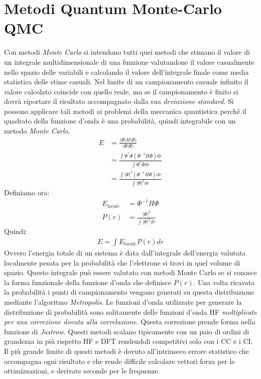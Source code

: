 \documentclass[oneside]{amsbook}
\numberwithin{section}{chapter}
\numberwithin{equation}{section}
\numberwithin{figure}{section}
\begin{document}
\section{Metodi Quantum Monte-Carlo QMC}
Con metodi \emph{Monte Carlo} si intendono tutti quei metodi che stimano il valore di un integrale multidimensionale di una funzione valutandone il valore casualmente nello spazio delle variabili e calcolando il valore dell'integrale finale come media statistica delle stime casuali. Nel limite di un campionamento casuale infinito il valore calcolato coincide con quello reale, ma se il campionamento è finito si dovrà riportare il risultato accompagnato dalla sua \emph{deviazione standard}.
Si possono applicare tali metodi ai problemi della meccanica quantistica perché il quadrato della funzione d'onda è una probabilità, quindi integrabile con un metodo \emph{Monte Carlo}.
\begin{equation}
\begin{aligned}
E&=\frac{\langle\Phi\vert H\vert \Phi \rangle}{\langle\Phi\vert\Phi\rangle} \\
&= \frac{\int \Phi^* \Phi (\Phi^{-1}H\Phi) dr}{\int \Phi^*\Phi dr} \\
&= \frac{\int\vert \Phi\vert^2 (\Phi^{-1}H\Phi) dr}{\int \vert \Phi\vert^2 dr} 
\end{aligned}
\end{equation}
Definiamo ora:
\begin{equation}
\begin{aligned}
E_{locale} &= \Phi^{-1}H\Phi \\
P(r) &=\frac{\vert \Phi\vert^2 }{\int \vert \Phi\vert^2 dr} 
\end{aligned}
\end{equation}
Quindi:
\begin{equation}
\begin{aligned}
E= \int E_{locale} P(r) dr
\end{aligned}
\end{equation}
Ovvero l'energia totale di un sistema è data dall'integrale dell'energia valutata localmente pesata per la probabilità che l'elettrone si trovi in quel volume di spazio.
Questo integrale può essere valutato con metodi Monte Carlo se si conosce la forma funzionale della funzione d'onda che definisce $P(r)$. Una volta ricavata la probabilità i punti di campionamento vengono generati su questa distribuzione mediante l'algoritmo \emph{Metropolis}. Le funzioni d'onda utilizzate per generare la distribuzione di probabilità sono solitamente delle funzioni d'onda HF \emph{moltiplicate per una correzione dovuta alla correlazione}. Questa correzione prende forma nella funzione di \emph{Jastrow}.
Questi metodi scalano tipicamente con un paio di ordini di grandezza in più rispetto HF e DFT rendendoli competitivi solo con i CC e i CI. Il più grande limite di questi metodi è dovuto all'intrinseco errore statistico che accompagna ogni risultato e che rende difficile calcolare vettori forza per le ottimizzazioni, e derivate seconde per le frequenze.
\end{document}
